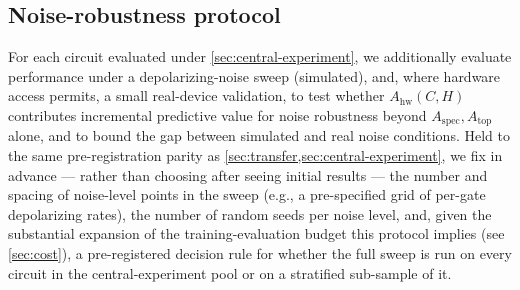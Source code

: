 \documentclass[11pt]{article}
\newcommand{\Aspec}{A_{\mathrm{spec}}}
\newcommand{\Atop}{A_{\mathrm{top}}}
\newcommand{\Ahw}{A_{\mathrm{hw}}}
\begin{document}
\subsection{Noise-robustness protocol}
For each circuit evaluated under \cref{sec:central-experiment}, we additionally evaluate performance under a depolarizing-noise sweep (simulated), and, where hardware access permits, a small real-device validation, to test whether $\Ahw(C,H)$ contributes incremental predictive value for noise robustness beyond $\Aspec,\Atop$ alone, and to bound the gap between simulated and real noise conditions. Held to the same pre-registration parity as \cref{sec:transfer,sec:central-experiment}, we fix in advance --- rather than choosing after seeing initial results --- the number and spacing of noise-level points in the sweep (e.g., a pre-specified grid of per-gate depolarizing rates), the number of random seeds per noise level, and, given the substantial expansion of the training-evaluation budget this protocol implies (see \cref{sec:cost}), a pre-registered decision rule for whether the full sweep is run on every circuit in the central-experiment pool or on a stratified sub-sample of it.
\end{document}
